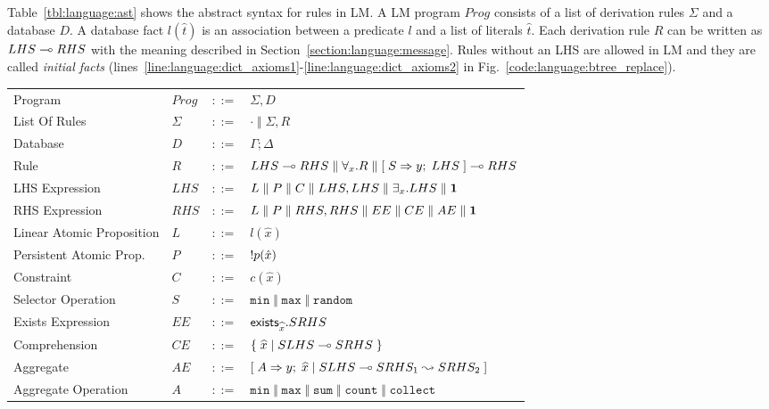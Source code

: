 Table~\ref{tbl:language:ast} shows the abstract syntax for rules in LM.  A LM
program $Prog$ consists of a list of derivation rules $\Sigma$ and a database
$D$. A database fact $l(\hat{t})$ is an association between a predicate $l$ and
a list of literals $\hat{t}$. Each derivation rule $R$ can be written as $LHS
\multimap RHS$ with the meaning described in
Section~\ref{section:language:message}.  Rules without an LHS are allowed in LM
and they are called \emph{initial facts}
(lines~\ref{line:language:dict_axioms1}-\ref{line:language:dict_axioms2} in
Fig.~\ref{code:language:btree_replace}).

\newcommand{\sop}[0]{\Vert}

\begin{table}[h]
\centering
\begin{tabular}{ l l c l }
  Program & $Prog$ & $::=$ & $\Sigma, D$ \\
  List Of Rules & $\Sigma$ & $::=$ & $\cdot \; \sop \; \Sigma, R$\\
  Database & $D$ & $::=$ & $\Gamma; \Delta$ \\
  Rule & $R$ & $::=$ & $LHS \lolli RHS \; \sop \; \forall_{x}. R \; \sop \;
  \selector{S}{y}{LHS}{RHS}$ \\
  LHS Expression & $LHS$ & $::=$ & $L \; \sop \; P \; \sop \; C \; \sop \; LHS,
  LHS \; \sop \; \exists_{x}. LHS \; \sop \; \one$\\
  RHS Expression & $RHS$ & $::=$ & $L \; \sop \; P \; \sop \; RHS, RHS \; \sop
  \; EE \; \sop \; CE \; \sop \; AE \; \sop \; \one$\\
  
  Linear Atomic Proposition & $L$ & $::=$ & $l(\hat{x})$\\
  Persistent Atomic Prop. & $P$ & $::=$ & ${!} p(\hat{x})$\\
  Constraint & $C$ & $::=$ & $c(\hat{x})$ \\
  Selector Operation & $S$ & $::=$ & $\mathtt{min} \; \sop \; \mathtt{max} \;
  \sop \; \mathtt{random}$\\
  
  Exists Expression & $EE$ & $::=$ & $\mathsf{exists}_{\widehat{x}}. SRHS$ \\
  Comprehension & $CE$ & $::=$ & $\{ \; \widehat{x} \; | \; SLHS \multimap SRHS \; \}$ \\

  Aggregate & $AE$ & $::=$ & $[\; A \Rightarrow y; \; \widehat{x} \; | \; SLHS \multimap SRHS_1 \leadsto SRHS_2 \;]$ \\
  Aggregate Operation & $A$ & $::=$ & $\mathtt{min} \; \sop \; \mathtt{max} \; \sop \;
\mathtt{sum} \; \sop \; \mathtt{count} \; \sop \; \mathtt{collect}$ \\
  

\end{tabular}
\end{table}
